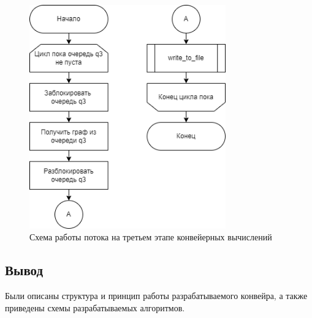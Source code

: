 \begin{figure}[h!btp]
	\centering
	\includegraphics[width=240pt]{inc/parallel_3.png}
	\caption{Схема работы потока на третьем этапе конвейерных вычислений}
	\label{fig:parallel_3}	
\end{figure}

\clearpage

\subsection*{Вывод}

Были описаны структура и принцип работы разрабатываемого конвейра, а также приведены схемы разрабатываемых алгоритмов.
